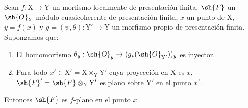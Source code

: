 \begin{proposition}[11.5.3]
\label{IV.11.5.3}
Sean $f:\mathrm{X}\to\mathrm{Y}$ un morfismo localmente de presentación finita,
$\sh{F}$ un $\sh{O}_\mathrm{X}$-módulo cuasicoherente de presentación finita, $x$ un punto de $\mathrm{X}$, $y=f(x)$ y $g=(\psi,\theta):\mathrm{Y}'\to\mathrm{Y}$
un morfismo propio de presentación finita. Supongamos que:
\begin{enumerate}[label=(\roman*)]
  \item El homomorfismo $\theta_y:\sh{O}_y\to(g_*(\sh{O}_{\mathrm{Y}'}))_y$ es inyector.
  \item Para todo $x'\in\mathrm{X}'=\mathrm{X}\times_\mathrm{Y}\mathrm{Y}'$ cuya proyección en $\mathrm{X}$ es $x$, $\sh{F}'=\sh{F}\otimes_\mathrm{Y}\mathrm{Y}'$ es
  plano sobre $\mathrm{Y}'$ en el punto $x'$.
\end{enumerate}

Entonces $\sh{F}$ es $f$-plano en el punto $x$.
\end{proposition}

